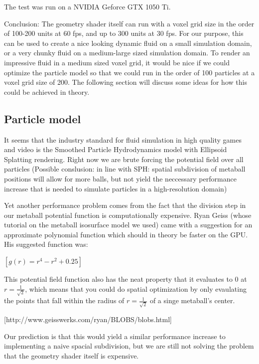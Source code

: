 \documentclass{article}
\begin{document}
\begin{multicols}{2}
        The test was run on a NVIDIA Geforce GTX 1050 Ti.

        Conclusion: The geometry shader itself can run with a voxel grid size in the order of 100-200 units at 60 fps, and up to 300 units at 30 fps.
        For our purpose, this can be used to create a nice looking dynamic fluid on a small simulation domain, or a very chunky fluid on a medium-large sized simulation domain.
        To render an impressive fluid in a medium sized voxel grid, it would be nice if we could optimize the particle model so that we could run in the order of 100 particles at a voxel grid size of 200.
        The following section will discuss some ideas for how this could be achieved in theory.

        \subsection{Particle model}
    	It seems that the industry standard for fluid simulation in high quality games and video is the Smoothed Particle Hydrodynamics model with Ellipsoid Splatting rendering.
        Right now we are brute forcing the potential field over all particles
        (Possible conslusion: in line with SPH: spatial subdivision of metaball positions will allow for more balls, but not yield the neccessary performance increase that is needed to simulate particles in a high-resolution domain)

        Yet another performance problem comes from the fact that the division step in our metaball potential function is computationally expensive.
        Ryan Geiss (whose tutorial on the metaball isosurface model we used) came with a suggestion for an approximate polynomial function which should in theory be faster on the GPU. His suggested function was:

        $[g(r) = r^4 - r^2 + 0.25]$

        This potential field function also has the neat property that it evaluates to 0 at $r=\frac{1}{\sqrt{2}}$, which means that you could do spatial optimization by only evaulating the points that fall within the radius of $r=\frac{1}{\sqrt{2}}$ of a singe metaball's center.

        [http://www.geisswerks.com/ryan/BLOBS/blobs.html]

        Our prediction is that this would yield a similar performance increase to implementing a naive spacial subdivision, but we are still not solving the problem that the geometry shader itself is expensive.

	\end{multicols}
\end{document}
